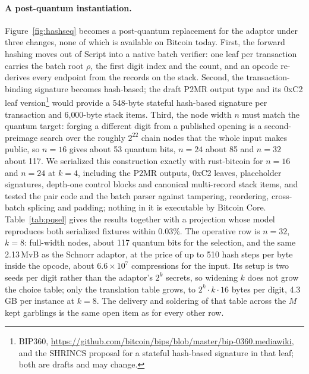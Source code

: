 \documentclass[11pt]{article}
\begin{document}
\paragraph{A post-quantum instantiation.} Figure~\ref{fig:hashseq} becomes
a post-quantum replacement for the adaptor under three changes, none of which
is available on Bitcoin today. First, the forward hashing moves out of Script
into a native batch verifier: one leaf per transaction carries the batch root
$\rho$, the first digit index and the count, and an opcode re-derives every
endpoint from the records on the stack. Second, the transaction-binding
signature becomes hash-based; the draft P2MR output type and its 0xC2 leaf
version\footnote{BIP360, \url{https://github.com/bitcoin/bips/blob/master/bip-0360.mediawiki}, and the SHRINCS proposal for a stateful hash-based signature in that leaf; both are drafts and may change.}
would provide a 548-byte stateful hash-based signature per transaction and
6{,}000-byte stack items. Third, the node width $n$ must match the quantum
target: forging a different digit from a published opening is a second-preimage
search over the roughly $2^{22}$ chain nodes that the whole input makes
public, so $n=16$ gives about 53 quantum bits, $n=24$ about 85 and $n=32$ about
117. We serialized this construction exactly with rust-bitcoin for $n=16$ and
$n=24$ at $k=4$, including the P2MR outputs, 0xC2 leaves, placeholder
signatures, depth-one control blocks and canonical multi-record stack items,
and tested the pair code and the batch parser against tampering, reordering,
cross-batch splicing and padding; nothing in it is executable by Bitcoin Core.
Table~\ref{tab:pqsel} gives the results together with a projection whose model
reproduces both serialized fixtures within $0.03\%$. The operative row is
$n=32$, $k=8$: full-width nodes, about 117 quantum bits for the selection, and
the same 2.13\,MvB as the Schnorr adaptor, at the price of up to 510 hash
steps per byte inside the opcode, about $6.6\times10^7$ compressions for the
input. Its setup is two seeds per digit rather than the adaptor's $2^k$
secrets, so widening $k$ does not grow the choice table; only the translation
table grows, to $2^k\cdot k\cdot 16$ bytes per digit, 4.3\,GB per instance at
$k=8$. The delivery and soldering of that table across the $M$ kept
garblings is the same open item as for every other row.
\end{document}

